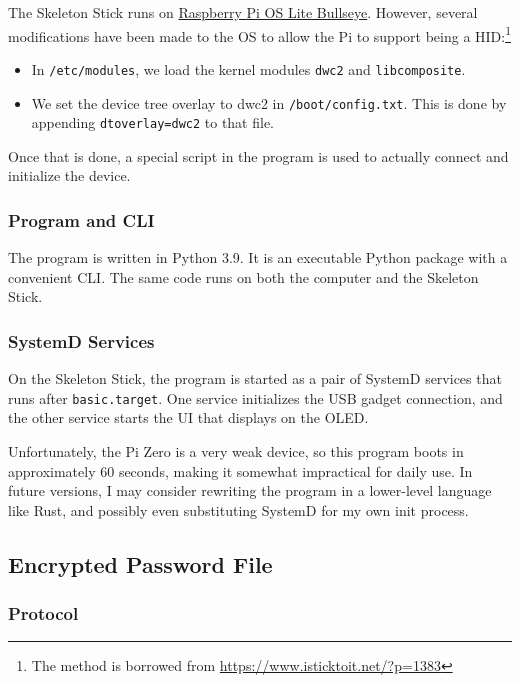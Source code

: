 \documentclass{article}
\begin{document}
The Skeleton Stick runs on \href{https://www.raspberrypi.com/software/}{Raspberry Pi OS Lite Bullseye}. However, several modifications have been made to the OS to allow the Pi to support being a HID:\footnote{The method is borrowed from \url{https://www.isticktoit.net/?p=1383}}

\begin{itemize}
    \item In \texttt{/etc/modules}, we load the kernel modules \texttt{dwc2} and \texttt{libcomposite}.
    \item We set the device tree overlay to dwc2 in \texttt{/boot/config.txt}. This is done by appending \texttt{dtoverlay=dwc2} to that file.
\end{itemize}

Once that is done, a special script in the program is used to actually connect and initialize the device.

\subsubsection{Program and CLI}

The program is written in Python 3.9. It is an executable Python package with a convenient CLI. The same code runs on both the computer and the Skeleton Stick.

\subsubsection{SystemD Services}

On the Skeleton Stick, the program is started as a pair of SystemD services that runs after \texttt{basic.target}. One service initializes the USB gadget connection, and the other service starts the UI that displays on the OLED.

Unfortunately, the Pi Zero is a very weak device, so this program boots in approximately 60 seconds, making it somewhat impractical for daily use. In future versions, I may consider rewriting the program in a lower-level language like Rust, and possibly even substituting SystemD for my own init process.

\subsection{Encrypted Password File}

\subsubsection{Protocol}
\end{document}
